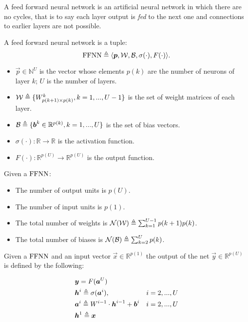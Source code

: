 
A feed forward neural network is an artificial neural network in which there are no cycles, that is to say each layer output is \textit{fed} to the 
next one and connections to earlier layers are not possible. 


\begin{defn}
\label{def_ffnn}
A feed forward neural network is a tuple:
$$\mathrm{FFNN}\triangleq \langle\boldsymbol{p},\mathcal{W},\mathcal{B},\sigma(\cdot),F(\cdot)\rangle.$$
\begin{itemize}
 \item $\vec{p} \in \mathbb{N}^U$ is the vector whose elements $p(k)$ are the number of neurons of layer $k$; $U$ is the number of layers.
 \item $\mathcal{W} \triangleq \{W^k_{p(k+1) \times p(k)}, k=1,...,U-1 \}$ is the set of weight matrices of each layer.
 \item $\mathcal{B} \triangleq \{\boldsymbol{b}^k \in \mathbb{R}^{p(k)}, k=1,...,U \} $ is the set of bias vectors.
 \item $\sigma(\cdot): \mathbb{R}\rightarrow \mathbb{R}$ is the activation function.
 \item $F(\cdot): \mathbb{R}^{p(U)}\rightarrow \mathbb{R}^{p(U)}$ is the output function.
\end{itemize}
\end{defn}

\begin{remark}{}
Given a $\mathrm{FFNN}$:
\begin{itemize}
 \item The number of output units is $p(U)$.
 \item The number of input units is $p(1)$.
 \item The total number of weights is $\mathcal{N}(\mathcal{W}) \triangleq \sum_{k=1}^{U-1} p(k+1)p(k)$.
 \item The total number of biases is $\mathcal{N}(\mathcal{B}) \triangleq \sum_{k=2}^{U} p(k)$.
\end{itemize}
\end{remark}

\begin{defn}
Given a $\mathrm{FFNN}$ and an input vector $\vec{x} \in \mathbb{R}^{p(1)}$ the output of the net $\vec{y} \in \mathbb{R}^{p(U)}$  is defined by the following:

\begin{align}
&\boldsymbol{y}=F(\boldsymbol{a}^{U}) &\\
&\boldsymbol{h}^{i} \triangleq \sigma(\boldsymbol{a}^{i}), & i=2,...,U\\
&\boldsymbol{a}^{i} \triangleq W^{i-1} \cdot \boldsymbol{h}^{i-1} +\boldsymbol{b}^i  & i=2,...,U\\
&\boldsymbol{h}^{1} \triangleq \boldsymbol{x} &
\end{align}
\end{defn}


